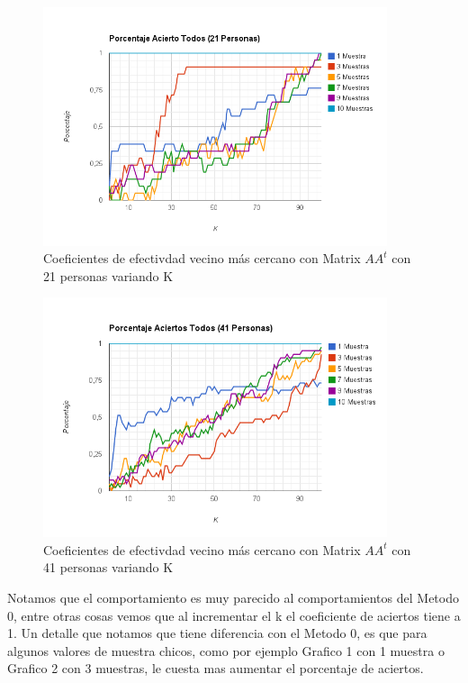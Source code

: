 \begin{figure}[H]
\includegraphics[width=0.9\textwidth]{img/imagek.png}
     \caption{Coeficientes de efectivdad vecino más cercano con Matrix $AA^t$ con 21 personas variando K}
\end{figure}

\begin{figure}[H]
\includegraphics[width=0.9\textwidth]{img/imagel.png}
     \caption{Coeficientes de efectivdad vecino más cercano con Matrix $AA^t$ con 41 personas variando K}
\end{figure}

Notamos que el comportamiento es muy parecido al comportamientos del Metodo 0, entre otras cosas vemos que al incrementar el k el coeficiente de aciertos tiene a 1.
Un detalle que notamos que tiene diferencia con el Metodo 0, es que para algunos valores de muestra chicos, como por ejemplo Grafico 1 con 1 muestra o Grafico 2 con 3 muestras, le cuesta mas aumentar el porcentaje de aciertos.

